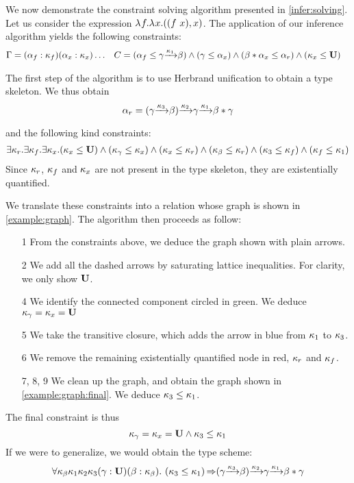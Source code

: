 We now demonstrate the constraint solving
algorithm presented in \cref{infer:solving}.
Let us consider the expression $\lambda^{{}} f.{\lambda^{{}} x.{((f\ x),x)}}$.
The application of our inference algorithm yields the following constraints:
%
\begin{align*}
  \Gamma &= (\alpha_f : \kappa_f)
  (\alpha_x : \kappa_x)\dots
  &C &= (\alpha_f \leq \gamma {\xrightarrow{\kappa_1}} \beta )
  \wedge
  (\gamma \leq \alpha_x)
  \wedge
  (\beta * \alpha_x \leq \alpha_r)
  \wedge
  (\kappa_x \leq \mathbf{U})
\end{align*}

The first step of the algorithm is to use Herbrand unification to obtain
a type skeleton. We thus obtain
$$\alpha_r =
(\gamma {\xrightarrow{\kappa_3}} \beta) {\xrightarrow{\kappa_2}} \gamma {\xrightarrow{\kappa_1}} \beta * \gamma$$

and the following kind constraints: 
\begin{gather*}
  \exists \kappa_r.\exists \kappa_f.\exists \kappa_x.(\kappa_x \leq \mathbf{U})
  \wedge
  (\kappa_\gamma \leq \kappa_x)
  \wedge
  (\kappa_x \leq \kappa_r)
  \wedge
  (\kappa_\beta \leq \kappa_r)
  \wedge
  (\kappa_3 \leq \kappa_f)
  \wedge
  (\kappa_f \leq \kappa_1)
\end{gather*}
Since $\kappa_r$, $\kappa_f$ and $\kappa_x$ are not present in the type skeleton,
they are existentially quantified.

We translate these constraints into a relation whose graph
is shown in \cref{example:graph}.
%
The algorithm then proceeds as follow:
\begin{itemize}[noitemsep]
\item[1] From the constraints above, we deduce the graph shown
  with plain arrows.
\item[2] We add all the dashed arrows by saturating
  lattice inequalities. For clarity, we only show $\mathbf{U}$.
\item[4] We identify the connected component circled in
  {\color{green} green}.
  We deduce $\kappa_\gamma = \kappa_x = \mathbf{U}$
\item[5] We take the transitive closure, which adds the
  arrow in {\color{blue} blue} from $\kappa_1$ to $\kappa_3$.
\item[6] We remove the remaining existentially quantified node in {\color{red} red}, $\kappa_r$ and $\kappa_f$.
\item[7, 8, 9] We clean up the graph, and obtain the graph shown
  in \cref{example:graph:final}.
  We deduce $\kappa_3 \leq \kappa_1$.
\end{itemize}

The final constraint is thus
$$\kappa_\gamma = \kappa_x = \mathbf{U} \wedge \kappa_3 \leq \kappa_1$$
If we were to generalize, we would obtain the type scheme:
$$\forall \kvar_\beta \kvar_1 \kvar_2 \kvar_3
(\gamma : \kun) (\beta : \kvar_\beta).\ %
\qual
{\Cleq{\kvar_3}{\kvar_1}}
{(\gamma \tarr{\kvar_3} \beta) \tarr{\kvar_2} \gamma \tarr{\kvar_1} \beta * \gamma}$$

